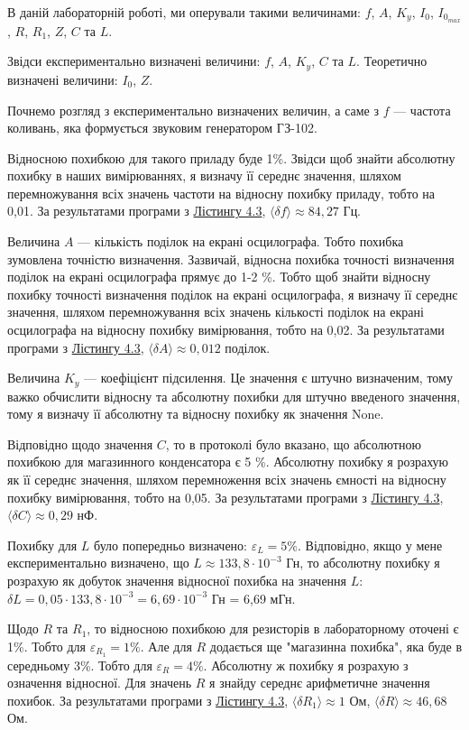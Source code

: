 \documentclass[12pt, a4paper]{article}
\begin{document}
    В даній лабораторній роботі, ми оперували такими величинами: $f$, $A$, $K_y$, $I_0$, $I_{0_{max}}$, $R$, $R_1$, $Z$, $C$ та $L$.

    Звідси експериментально визначені величини: $f$, $A$, $K_y$, $C$ та $L$. Теоретично визначені величини: $I_0$, $Z$.

    Почнемо розгляд з експериментально визначених величин, а саме з $f$ --- частота коливань, яка формується звуковим генератором ГЗ-102.

    Відносною похибкою для такого приладу буде 1\%. Звідси щоб знайти абсолютну похибку в наших вимірюваннях, я визначу її середнє значення, шляхом перемножування всіх значень
    частоти на відносну похибку приладу, тобто на 0,01. За результатами програми з \hyperlink{listing3}{Лістингу 4.3}, $\text{⟨}\delta f\text{⟩} \approx 84,27$ Гц.

    Величина $A$ --- кількість поділок на екрані осцилографа. Тобто похибка зумовлена точністю визначення. Зазвичай, відносна похибка точності визначення поділок на
    екрані осцилографа прямує до 1-2 \%. Тобто щоб знайти відносну похибку точності визначення поділок на екрані осцилографа,
    я визначу її середнє значення, шляхом перемножування всіх значень кількості поділок на екрані осцилографа на відносну похибку вимірювання, тобто на 0,02.
    За результатами програми з \hyperlink{listing3}{Лістингу 4.3}, $\text{⟨}\delta A\text{⟩} \approx 0,012$ поділок.

    Величина $K_y$ --- коефіцієнт підсилення. Це значення є штучно визначеним, тому важко обчислити відносну та абсолютну похибки для штучно введеного значення, тому
    я визначу її абсолютну та відносну похибку як значення None.

    Відповідно щодо значення $C$, то в протоколі було вказано, що абсолютною похибкою для магазинного конденсатора є 5 \%. Абсолютну похибку я
    розрахую як її середнє значення, шляхом перемноження всіх значень ємності на відносну похибку вимірювання, тобто на 0,05.
    За результатами програми з \hyperlink{listing3}{Лістингу 4.3}, $\text{⟨}\delta C\text{⟩} \approx 0,29$ нФ.

    Похибку для $L$ було попередньо визначено: $\varepsilon_L = 5\%$. Відповідно, якщо у мене експериментально визначено, що $L \approx 133,8 \cdot 10^{-3}$ Гн,
    то абсолютну похибку я розрахую як добуток значення відносної похибка на значення $L$: $\delta L = 0,05 \cdot 133,8 \cdot 10^{-3} = 6,69 \cdot 10^{-3}$ Гн = 6,69 мГн.

    Щодо $R$ та $R_1$, то відносною похибкою для резисторів в лабораторному оточені є 1\%. Тобто для $\varepsilon_{R_1} = 1\%$. Але для $R$ додається ще "магазинна похибка", 
    яка буде в середньому 3\%. Тобто для $\varepsilon_R = 4\%$. Абсолютну ж похибку я розрахую з означення відносної. Для значень $R$ я знайду середнє арифметичне значення похибок.
    За результатами програми з \hyperlink{listing3}{Лістингу 4.3}, $\text{⟨}\delta R_1\text{⟩} \approx 1$ Ом, $\text{⟨}\delta R\text{⟩} \approx 46,68$ Ом.
\end{document}
